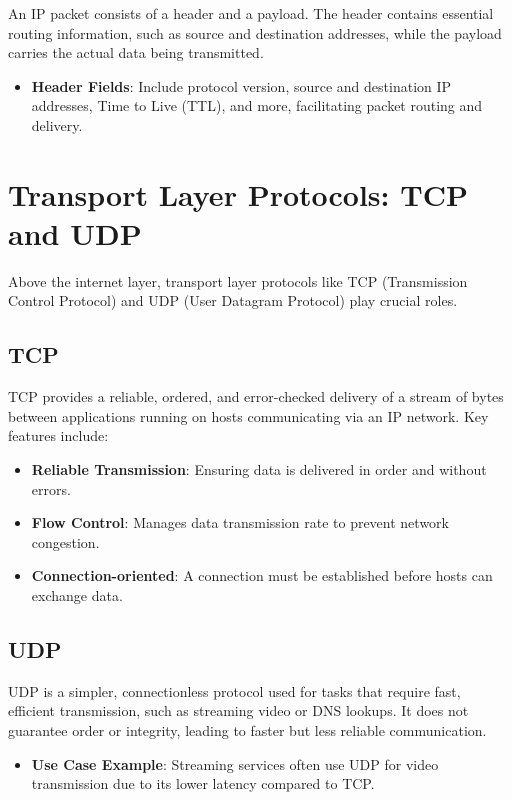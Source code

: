 \documentclass{article}
\begin{document}
An IP packet consists of a header and a payload. The header contains essential routing information, such as source and destination addresses, while the payload carries the actual data being transmitted.

\begin{itemize}
  \item \textbf{Header Fields}: Include protocol version, source and destination IP addresses, Time to Live (TTL), and more, facilitating packet routing and delivery.
\end{itemize}

\section{Transport Layer Protocols: TCP and UDP}

Above the internet layer, transport layer protocols like TCP (Transmission Control Protocol) and UDP (User Datagram Protocol) play crucial roles.

\subsection{TCP}

TCP provides a reliable, ordered, and error-checked delivery of a stream of bytes between applications running on hosts communicating via an IP network. Key features include:

\begin{itemize}
  \item \textbf{Reliable Transmission}: Ensuring data is delivered in order and without errors.
  \item \textbf{Flow Control}: Manages data transmission rate to prevent network congestion.
  \item \textbf{Connection-oriented}: A connection must be established before hosts can exchange data.
\end{itemize}

\subsection{UDP}

UDP is a simpler, connectionless protocol used for tasks that require fast, efficient transmission, such as streaming video or DNS lookups. It does not guarantee order or integrity, leading to faster but less reliable communication.

\begin{itemize}
  \item \textbf{Use Case Example}: Streaming services often use UDP for video transmission due to its lower latency compared to TCP.
\end{itemize}
\end{document}
